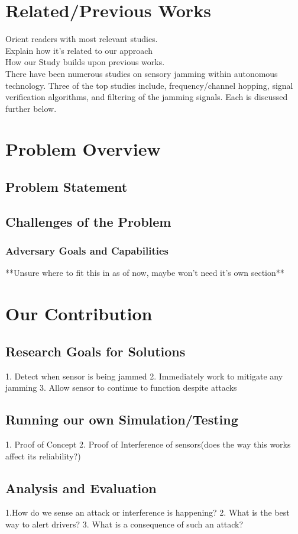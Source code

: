\documentclass[conference]{IEEEtran}
\begin{document}
\section{Related/Previous Works}
Orient readers with most relevant studies. \\
Explain how it's related to our approach\\
How our Study builds upon previous works.\\
There have been numerous studies on sensory jamming within autonomous technology. 
Three of the top studies include, frequency/channel hopping, signal verification algorithms, 
and filtering of the jamming signals. Each is discussed further below.\\

\section{Problem Overview}
\subsection{Problem Statement}
\subsection{Challenges of the Problem}
\subsubsection{Adversary Goals and Capabilities}
**Unsure where to fit this in as of now, maybe won't need it's own section**
\section{Our Contribution}
\subsection{Research Goals for Solutions}
1. Detect when sensor is being jammed
2. Immediately work to mitigate any jamming
3. Allow sensor to continue to function despite attacks
\subsection{Running our own Simulation/Testing}
1. Proof of Concept
2. Proof of Interference of sensors(does the way this works affect its reliability?)
\subsection{Analysis and Evaluation}
1.How do we sense an attack or interference is happening?
2. What is the best way to alert drivers?
3. What is a consequence of such an attack?
\end{document}
